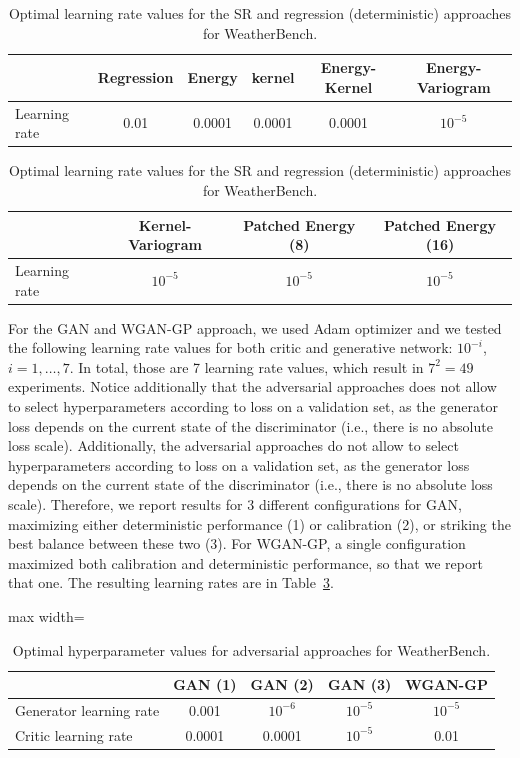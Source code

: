 \documentclass[twoside,11pt]{article}
\begin{document}
	
	\begin{table}
		\begin{center}
			\begin{tabular}{lccccc}
				\toprule
				& Regression& Energy & kernel & Energy-Kernel & Energy-Variogram  \\
				\midrule
				Learning rate & 0.01 &  0.0001 & 0.0001& 0.0001& $ 10^{-5} $ \\
				\bottomrule
			\end{tabular}
			\begin{tabular}{lccc}
				\toprule
				& Kernel-Variogram & Patched Energy (8) & Patched Energy (16) \\
				\midrule
				Learning rate &  $ 10^{-5} $& $ 10^{-5} $& $ 10^{-5} $ \\
				\bottomrule
			\end{tabular}
		\end{center}
		\caption{Optimal learning rate values for the SR and regression (deterministic) approaches for WeatherBench.}
		\label{tab:weatherbench_lr_SRs}
	\end{table}
	
	
	
	
	For the GAN and WGAN-GP approach, we used Adam optimizer and we tested the following learning rate values for both critic and generative network: $ 10^{-i} $, $ i=1,\ldots, 7$. In total, those are 7 learning rate values, which result in $ 7^2 = 49 $ experiments. Notice additionally that the adversarial approaches does not allow to select hyperparameters according to loss on a validation set, as the generator loss depends on the current state of the discriminator (i.e., there is no absolute loss scale). Additionally, the adversarial approaches do not allow to select hyperparameters according to loss on a validation set, as the generator loss depends on the current state of the discriminator (i.e., there is no absolute loss scale). Therefore, we report results for 3 different configurations for GAN, maximizing either deterministic performance (1) or calibration (2), or striking the best balance between these two (3). For WGAN-GP, a single configuration maximized both calibration and deterministic performance, so that we report that one. The resulting learning rates are in Table~\ref{tab:lr_Weatherbench_GAN}. 
	
	\begin{table}
		\begin{center}
			\begin{adjustbox}{max width=\textwidth}
				\begin{tabular}{lcccc}
					\toprule
					& GAN (1)	& GAN (2) &GAN (3) & WGAN-GP \\
					\midrule
					Generator learning rate & 0.001 &$ 10^{-6} $& $ 10^{-5} $& $ 10^{-5} $\\
					Critic learning rate &0.0001 & 0.0001& $ 10^{-5} $ & 0.01 \\
					\bottomrule
				\end{tabular}
			\end{adjustbox}
		\end{center}
		\caption{Optimal hyperparameter values for adversarial approaches for WeatherBench.}
		\label{tab:lr_Weatherbench_GAN}
	\end{table}
	
\end{document}
